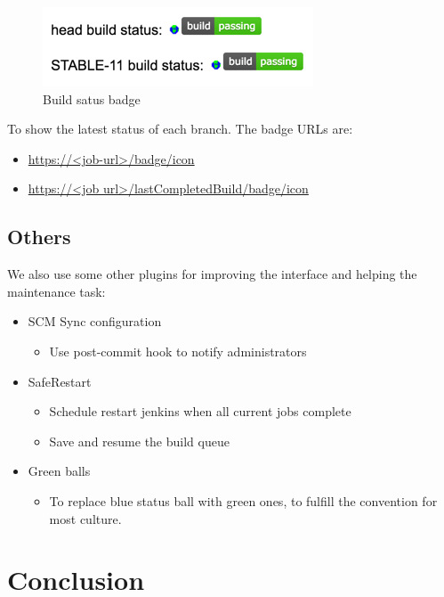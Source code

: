 \documentclass[a4paper,twocolumn,10pt]{article}
\begin{document}
\begin{figure}
\includegraphics{build-status-badge.png}
\caption{Build satus badge}
\label{build-status-badge}
\end{figure}

To show the latest status of each branch. The badge URLs are:
\begin{itemize}
\item \url{https://<job-url>/badge/icon}
\item \url{https://<job url>/lastCompletedBuild/badge/icon}
\end{itemize}

\subsection{Others}

We also use some other plugins for improving the interface and helping the
maintenance task:

\begin{itemize}
\item SCM Sync configuration \cite{jenkins-scm-sync-configuration-plugin}
  \begin{itemize}
  \item Use post-commit hook to notify administrators
  \end{itemize}
\item SafeRestart \cite{jenkins-saferestart-plugin}
  \begin{itemize}
  \item Schedule restart jenkins when all current jobs complete
  \item Save and resume the build queue
  \end{itemize}
\item Green balls \cite{jenkins-green-balls-plugin}
  \begin{itemize}
  \item To replace blue status ball with green ones, to fulfill the convention
        for most culture.
  \end{itemize}
\end{itemize}

\section{Conclusion}
\end{document}
